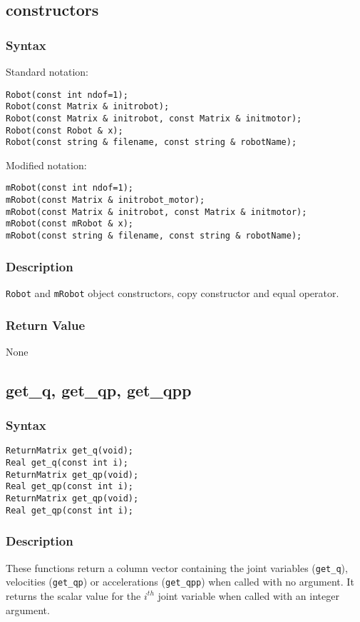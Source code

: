 \documentclass[dvips,11pt,fleqn]{report}
\begin{document}
\newpage

\subsection*{constructors}
\subsubsection*{Syntax}

Standard notation:
\begin{verbatim}
Robot(const int ndof=1);
Robot(const Matrix & initrobot);
Robot(const Matrix & initrobot, const Matrix & initmotor);
Robot(const Robot & x);
Robot(const string & filename, const string & robotName);
\end{verbatim}
Modified notation:
\begin{verbatim}
mRobot(const int ndof=1);
mRobot(const Matrix & initrobot_motor);
mRobot(const Matrix & initrobot, const Matrix & initmotor);
mRobot(const mRobot & x);
mRobot(const string & filename, const string & robotName);
\end{verbatim}
\subsubsection*{Description}

\texttt{Robot} and \texttt{mRobot} object constructors, copy
constructor and equal operator.


\subsubsection*{Return Value}

None

\newpage

\subsection*{get\_q, get\_qp, get\_qpp}
\subsubsection*{Syntax}
\begin{verbatim}
ReturnMatrix get_q(void);
Real get_q(const int i);
ReturnMatrix get_qp(void);
Real get_qp(const int i);
ReturnMatrix get_qp(void);
Real get_qp(const int i);
\end{verbatim}
\subsubsection*{Description}
These functions return a column vector containing the joint variables
(\texttt{get\_q}), velocities (\texttt{get\_qp}) or accelerations
(\texttt{get\_qpp}) when called with no argument. It returns the
scalar value for the $i^{th}$ joint variable when called with an
integer argument.
\end{document}

